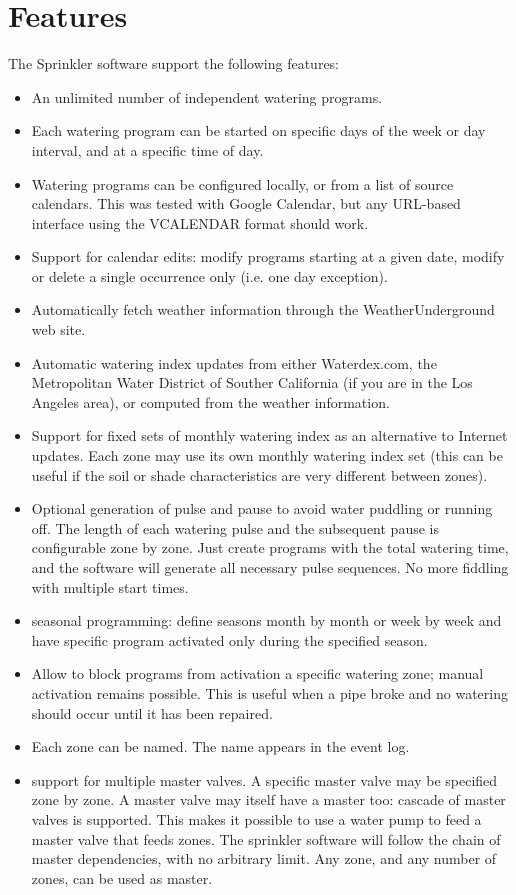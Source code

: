 \documentclass[11pt]{book}
\begin{document}
\section{Features}
The Sprinkler software support the following features:
\begin{itemize}
\item An unlimited number of independent watering programs.
\item Each watering program can be started on specific days of the week or day interval, and at a specific time of day.
\item Watering programs can be configured locally, or from a list of source calendars. This was tested with Google Calendar, but any URL-based interface using the VCALENDAR format should work.
\item Support for calendar edits: modify programs starting at a given date, modify or delete a single occurrence only (i.e. one day exception).
\item Automatically fetch weather information through the WeatherUnderground web site.
\item Automatic watering index updates from either Waterdex.com,  the Metropolitan Water District of Souther California (if you are in the Los Angeles area), or computed from the weather information.
\item Support for fixed sets of monthly watering index as an alternative to Internet updates. Each zone may use its own monthly watering index set (this can be useful if the soil or shade characteristics are very different between zones).
\item Optional generation of pulse and pause to avoid water puddling or running off. The length of each watering pulse and the subsequent pause is configurable zone by zone. Just create programs with the total watering time, and the software will generate all necessary pulse sequences. No more fiddling with multiple start times.
\item seasonal programming: define seasons month by month or week by week and have specific program activated only during the specified season.
\item Allow to block programs from activation a specific watering zone; manual activation remains possible. This is useful when a pipe broke and no watering should occur until it has been repaired.
\item Each zone can be named. The name appears in the event log.
\item support for multiple master valves. A specific master valve may be specified zone by zone. A master valve may itself have a master too: cascade of master valves is supported. This makes it possible to use a water pump to feed a master valve that feeds zones. The sprinkler software will follow the chain of master dependencies, with no arbitrary limit. Any zone, and any number of zones, can be used as master.

\end{itemize}
\end{document}

